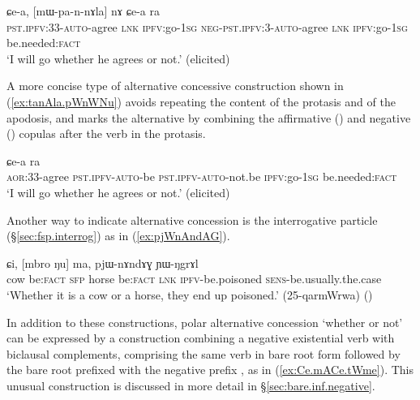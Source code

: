 \begin{exe}
\ex  \label{ex:pannAla.nA}
\gll  [pa-n-nɤla] ɕe-a, [mɯ-pa-n-nɤla] nɤ ɕe-a ra    \\
 \textsc{pst}.\textsc{ipfv}:3\fl{}3-\textsc{auto}-agree \textsc{lnk} \textsc{ipfv}:go-\textsc{1sg}
  \textsc{neg}-\textsc{pst}.\textsc{ipfv}:3\fl{}-\textsc{auto}-agree \textsc{lnk} \textsc{ipfv}:go-\textsc{1sg} be.needed:\textsc{fact} \\
\glt `I will go whether he agrees or not.' (elicited)
\end{exe}

A more concise type of alternative concessive construction shown in (\ref{ex:tanAla.pWnWNu}) avoids repeating the content of the protasis and of the apodosis, and marks the alternative by combining the affirmative () and negative () copulas after the verb in the protasis.

\begin{exe}
\ex  \label{ex:tanAla.pWnWNu}
 ɕe-a ra \\
\textsc{aor}:3\fl{}3-agree \textsc{pst}.\textsc{ipfv}-\textsc{auto}-be \textsc{pst}.\textsc{ipfv}-\textsc{auto}-not.be \textsc{ipfv}:go-\textsc{1sg} be.needed:\textsc{fact} \\
\glt `I will go whether he agrees or not.' (elicited)
\end{exe}
 
Another way to indicate alternative concession is the interrogative particle  (§\ref{sec:fsp.interrog}) as in (\ref{ex:pjWnAndAG}).

\begin{exe}
\ex  \label{ex:pjWnAndAG}
\gll [nɯŋa ŋu] ɕi, [mbro ŋu] ma, pjɯ-nɤndɤɣ ɲɯ-ŋgrɤl  \\
cow be:\textsc{fact} \textsc{sfp} horse  be:\textsc{fact} \textsc{lnk} \textsc{ipfv}-be.poisoned \textsc{sens}-be.usually.the.case \\
\glt `Whether it is a cow or a horse, they end up poisoned.' (25-qarmWrwa)
()
\end{exe}

In addition to these constructions, polar alternative concession `whether or not' can be expressed by a construction combining a negative existential verb with biclausal complements, comprising the same verb in bare root form followed by the bare root prefixed with the negative prefix , as in (\ref{ex:Ce.mACe.tWme}). This unusual construction is discussed in more detail in §\ref{sec:bare.inf.negative}.

